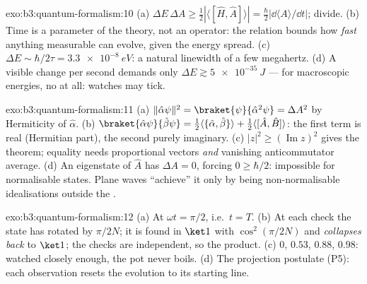 \begin{solution}{exo:b3:quantum-formalism:10}
(a) $\Delta E\,\Delta A \ge \tfrac12|\langle[\hat H, \hat
A]\rangle| = \tfrac\hbar2|\dd\langle A\rangle/\dd t|$; divide. (b)
Time is a parameter of the theory, not an operator: the relation
bounds how \emph{fast} anything measurable can evolve, given the
energy spread. (c) $\Delta E \sim \hbar/2\tau = \qty{3.3e-8}{eV}$:
a natural linewidth of a few megahertz. (d) A visible change per
second demands only $\Delta E \gtrsim \qty{5e-35}{J}$ --- for
macroscopic energies, no  at all: watches may tick.
\end{solution}

\begin{solution}{exo:b3:quantum-formalism:11}
(a) $\|\hat\alpha\psi\|^2 = \braket{\psi}{\hat\alpha^2\psi} =
\Delta A^2$ by Hermiticity of $\hat\alpha$. (b) $\braket{\hat\alpha
\psi}{\hat\beta\psi} = \tfrac12\langle\{\hat\alpha,
\hat\beta\}\rangle + \tfrac12\langle[\hat A, \hat B]\rangle$: the
first term is real (Hermitian part), the second purely imaginary.
(c) $|z|^2 \ge (\operatorname{Im}z)^2$ gives the theorem; equality
needs proportional vectors \emph{and} vanishing anticommutator
average. (d) An eigenstate of $\hat A$ has $\Delta A = 0$, forcing
$0 \ge \hbar/2$: impossible for normalisable states. Plane waves
``achieve'' it only by being non-normalisable idealisations outside
the .
\end{solution}

\begin{solution}{exo:b3:quantum-formalism:12}
(a) At $\omega t = \pi/2$, i.e.\ $t = T$. (b) At each check the
state has rotated by $\pi/2N$; it is found in $\ket1$ with
$\cos^2(\pi/2N)$ and \emph{collapses back} to $\ket1$; the checks
are independent, so the product. (c) $0$, $0.53$, $0.88$, $0.98$:
watched closely enough, the pot never boils. (d) The projection
postulate (P5): each observation resets the evolution to its
starting line.
\end{solution}

